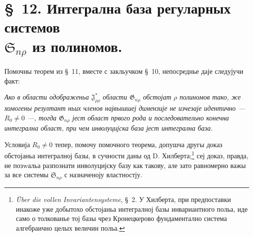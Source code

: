 ﻿\documentclass[11pt]{article}
\providecommand{\Ssys}{\mathfrak{S}}
\providecommand{\Jdom}{\mathfrak{J}}
\providecommand{\Gdom}{\mathfrak{G}}
\begin{document}
\section*{\S\ 12. Интегрална база регуларных системов\\ $\Ssys_{n\rho}$ из полиномов.}

Помочны теорем из \S\ 11, вместе с закльучком \S\ 10, непосреднье даје следујучи факт:

{\itshape Ако в области одображеньа $\Jdom^*_{\rho\rho}$ области $\Gdom_{n\rho}$ обстојат $\rho$ полиномов тако, же хомогены резултант ньих членов највышшеј димензије не изчезаје идентично --- $R_0\ne0$ ---, тогда $\Gdom_{n\rho}$ јест област првого рода и последовательно конечна интегрална област, при чем инволуцијска база јест интегрална база.}

Условија $R_0\ne0$ тепер, помочу помочного теорема, допушча другы доказ обстојаньа интегралној базы, в сучности даны од D. Хилберта;\footnote{\emph{Über die vollen Invariantensysteme}, \S\ 2. У Хилберта, при предпоставки инакоже уже добытохо обстојаньа интегралној базы инвариантного польа, иде само о толкованье тој базы чрез Кронецкерово фундаментално система алгебраично целых величин польа.} сеј доказ, правда, не позwальа разпознати инволуцијску базу как такову, але зато равномерно важы за все системы $\Ssys_{n\rho}$ с назначеноју властностју.
\end{document}
